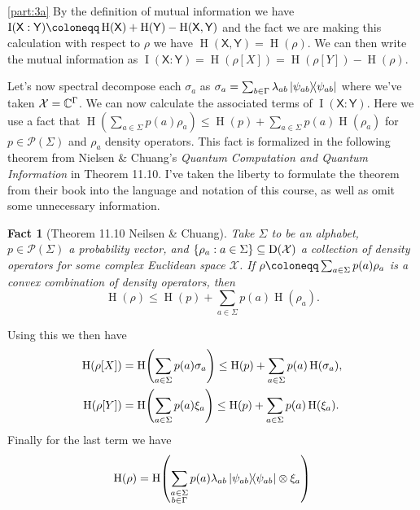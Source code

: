 \documentclass[boxes,pages,color=SeaGreen]{homework}
\newtheorem*{fact}{Fact}
\renewcommand{\op}[1]{\operatorname{#1}}
\newcommand{\X}{\mathcal{X}}
\renewcommand{\P}{\mathcal{P}}
\newcommand{\reg}[1]{\mathsf{#1}}
\newcommand{\ent}{\operatorname{H}}
\newcommand{\Density}{\mathrm{D}}
\begin{document}
\begin{solution}
    \ref{part:3a}
    By the definition of mutual information we have $\op{I}(\reg{X} : \reg{Y}) \defeq \ent(\reg{X}) + \ent(\reg{Y}) - \ent(\reg{X}, \reg{Y})$ and the fact we are making this calculation with respect to $\rho$ we have $\ent(\reg{X}, \reg{Y}) = \ent(\rho)$.
    We can then write the mutual information as $\op{I}(\reg{X} : \reg{Y}) = \ent(\rho[X]) = \ent(\rho[Y]) - \ent(\rho)$.

    Let's now spectral decompose each $\sigma_a$ as $\sigma_a = \sum_{b\in\Gamma} \lambda_{ab}\ketbra{\psi_{ab}}$ where we've taken $\X = \C^\Gamma$.
    We can now calculate the associated terms of $\op{I}(\reg{X} : \reg{Y})$.
    Here we use a fact that $\ent(\sum_{a \in \Sigma} p(a) \rho_a) \leq \ent(p) + \sum_{a \in \Sigma} p(a) \ent(\rho_a)$ for $p\in\P(\Sigma)$ and $\rho_a$ density operators.
    This fact is formalized in the following theorem from Nielsen \& Chuang's \emph{Quantum Computation and Quantum Information} in Theorem 11.10.
    I've taken the liberty to formulate the theorem from their book into the language and notation of this course, as well as omit some unnecessary information.
    \begin{fact}[Theorem 11.10 Neilsen \& Chuang]
        Take $\Sigma$ to be an alphabet, $p \in \P(\Sigma)$ a probability vector, and $\qty{\rho_a : a \in \Sigma} \subseteq \Density(\X)$ a collection of density operators for some complex Euclidean space $\X$.
        If $\rho \defeq \sum_{a \in \Sigma} p(a)\rho_a$ is a convex combination of density operators, then
        \begin{equation*}
            \ent(\rho) \leq \ent(p) + \sum_{a \in \Sigma} p(a) \ent(\rho_a).
        \end{equation*}
    \end{fact}
    Using this we then have
    \begin{align*}
        \ent(\rho[X]) & = \ent\!\qty(\sum_{a \in \Sigma} p(a) \sigma_a) \leq \ent(p) + \sum_{a \in \Sigma} p(a) \ent(\sigma_a), \\
        \ent(\rho[Y]) & = \ent\!\qty(\sum_{a \in \Sigma} p(a) \xi_a)    \leq \ent(p) + \sum_{a \in \Sigma} p(a) \ent(\xi_a).
    \end{align*}
    Finally for the last term we have
    \begin{align*}
        \ent(\rho) & = \ent\!\qty(\sum_{\substack{a \in \Sigma                                                                                                  \\ b \in \Gamma}} p(a) \lambda_{ab} \ketbra{\psi_{ab}} \otimes \xi_a) \\

\end{align*}
\end{solution}
\end{document}
